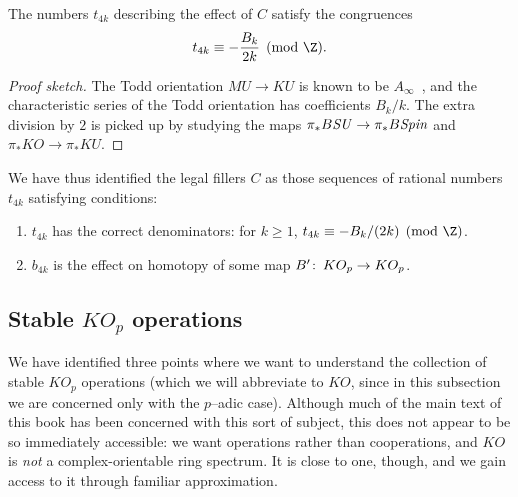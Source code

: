 \begin{corollary}
The numbers \(t_{4k}\) describing the effect of \(C\) satisfy the congruences \[t_{4k} \equiv -\frac{B_k}{2k} \pmod{\Z}.\]
\end{corollary}
\begin{proof}[Proof sketch]
The Todd orientation \(MU \to KU\) is known to be \(A_\infty\)~\cite[Theorem V.4.1]{EKMM}, and the characteristic series of the Todd orientation has coefficients \(B_k / k\).  The extra division by \(2\) is picked up by studying the maps \(\pi_* B\mathit{SU} \to \pi_* B\mathit{Spin}\) and \(\pi_* KO \to \pi_* KU\).
\end{proof}

We have thus identified the legal fillers \(C\) as those sequences of rational numbers \(t_{4k}\) satisfying conditions:
\begin{enumerate}
    \item \(t_{4k}\) has the correct denominators: for \(k \ge 1\), \(t_{4k} \equiv -B_k/(2k) \pmod{\Z}\). \label{KOMillerCondition}
    \item \(b_{4k}\) is the effect on homotopy of some map \(B'\colon\thinspace KO_p \to KO_p\). \label{KOKummerCondition}
\end{enumerate}


\subsection{Stable \(KO_p\) operations}

We have identified three points where we want to understand the collection of stable \(KO_p\) operations (which we will abbreviate to \(KO\), since in this subsection we are concerned only with the \(p\)--adic case).  Although much of the main text of this book has been concerned with this sort of subject, this does not appear to be so immediately accessible: we want operations rather than cooperations, and \(KO\) is \emph{not} a complex-orientable ring spectrum.  It is close to one, though, and we gain access to it through familiar approximation.

